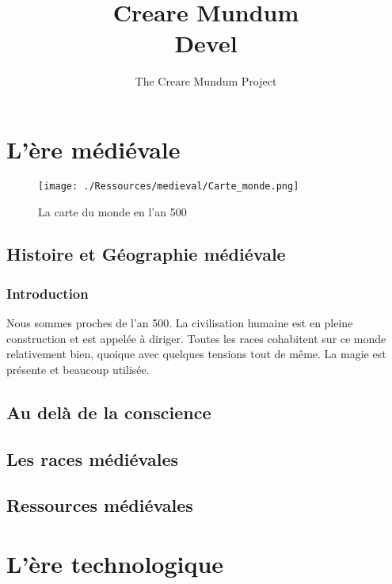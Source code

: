\documentclass{book}
\title{Creare Mundum \\ Devel}
\author{The Creare Mundum Project}
\begin{document}
\maketitle
\setcounter{tocdepth}{2} %
\renewcommand{\contentsname}{Sommaire} 
\tableofcontents

\part{L'ère médiévale}
\begin{figure}
\begin{center}
\hypertarget{cartedumonde}{}
\texttt{[image: ./Ressources/medieval/Carte\_monde.png]}
\caption{La carte du monde en l'an 500}
\end{center}
\end{figure}
\chapter{Histoire et Géographie médiévale}
\section{Introduction}
Nous sommes proches de l'an 500. La civilisation humaine est en pleine construction et est appelée à diriger.
Toutes les races cohabitent sur ce monde relativement bien, quoique avec quelques tensions tout de même.
La magie est présente et beaucoup utilisée.

 

\chapter{Au delà de la conscience}




\chapter{Les races médiévales}


\chapter{Ressources médiévales}


\part{L'ère technologique}
\end{document}
